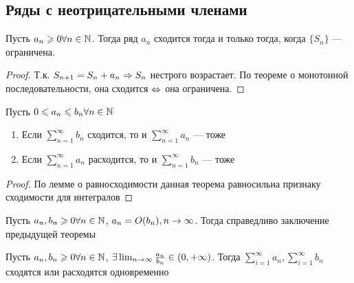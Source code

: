 \subsection{Ряды с неотрицательными членами}
\begin{lemma}
    Пусть \(a_n \geqslant 0 \forall n \in \mathbb{N}\). Тогда ряд \(a_n\) сходится тогда и только тогда, когда \(\{S_n\}\) --- ограничена.
\end{lemma}
\begin{proof}
    Т.к. \(S_{n+1} = S_n + a_n \Rightarrow S_n\) нестрого возрастает. По теореме о монотонной последовательности, она сходится \(\Leftrightarrow\) она ограничена.
\end{proof}
\begin{theorem}
    Пусть  \(0 \leqslant a_n \leqslant b_n \forall n \in \mathbb{N}\)
    \begin{enumerate}
        \item Если \(\sum_{n = 1}^\infty b_n\) сходится, то и \(\sum_{n = 1}^\infty a_n\) --- тоже
        \item Если \(\sum_{n = 1}^\infty a_n\) расходится, то и \(\sum_{n = 1}^\infty b_n\) --- тоже
    \end{enumerate}
\end{theorem}
\begin{proof}
    По лемме о равносходимости данная теорема равносильна признаку сходимости для интегралов
\end{proof}
\begin{corollary}
    Пусть \(a_n, b_n \geqslant 0 \forall n \in \mathbb{N}\), \(a_n = O(b_n), n\rightarrow \infty\). Тогда справедливо заключение предыдущей теоремы
\end{corollary}
\begin{corollary}
    Пусть \(a_n, b_n \geqslant 0 \forall n \in \mathbb{N}\), \(\exists \lim_{n\rightarrow\infty}\frac{a_n}{b_n} \in (0, +\infty)\). Тогда \(\sum_{i = 1}^\infty a_n, \sum_{i = 1}^\infty b_n\) сходятся или расходятся одновременно
\end{corollary}